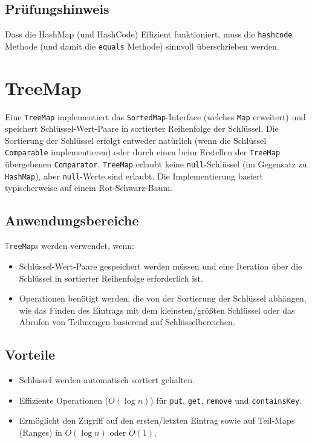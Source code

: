 \subsection{Prüfungshinweis}
Dass die HashMap (und HashCode) Effizient funktioniert, muss die
\lstinline{hashcode} Methode (und damit die \lstinline{equals} Methode)
sinnvoll überschrieben werden.

\section{TreeMap}
Eine \texttt{TreeMap} implementiert das \texttt{SortedMap}-Interface (welches
\texttt{Map} erweitert) und speichert Schlüssel-Wert-Paare in sortierter
Reihenfolge der Schlüssel. Die Sortierung der Schlüssel erfolgt entweder
natürlich (wenn die Schlüssel \texttt{Comparable} implementieren) oder durch
einen beim Erstellen der \texttt{TreeMap} übergebenen \texttt{Comparator}.
\texttt{TreeMap} erlaubt keine \texttt{null}-Schlüssel (im Gegensatz zu
\texttt{HashMap}), aber \texttt{null}-Werte sind erlaubt. Die Implementierung
basiert typischerweise auf einem Rot-Schwarz-Baum.

\subsection{Anwendungsbereiche}
\texttt{TreeMap}s werden verwendet, wenn:
\begin{itemize}
    \item Schlüssel-Wert-Paare gespeichert werden müssen und eine Iteration über die
          Schlüssel in sortierter Reihenfolge erforderlich ist.
    \item Operationen benötigt werden, die von der Sortierung der Schlüssel abhängen, wie
          das Finden des Eintrags mit dem kleinsten/größten Schlüssel oder das Abrufen
          von Teilmengen basierend auf Schlüsselbereichen.
\end{itemize}

\subsection{Vorteile}
\begin{itemize}
    \item Schlüssel werden automatisch sortiert gehalten.
    \item Effiziente Operationen ($O(\log n)$) für \texttt{put}, \texttt{get},
          \texttt{remove} und \texttt{containsKey}.
    \item Ermöglicht den Zugriff auf den ersten/letzten Eintrag sowie auf Teil-Maps
          (Ranges) in $O(\log n)$ oder $O(1)$.
\end{itemize}

